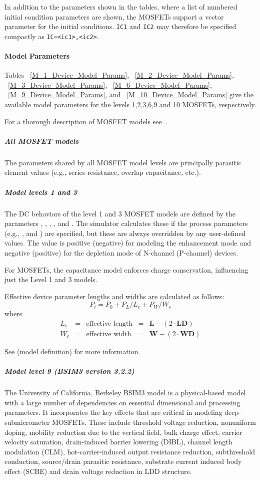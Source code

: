 In addition to the parameters shown in the tables, where a list of
numbered initial condition parameters are shown, the MOSFETs support a vector
parameter for the initial conditions.  \texttt{IC1} and \texttt{IC2}
may therefore be specified compactly as \texttt{IC=<ic1>,<ic2>}.

\paragraph{Model Parameters}
Tables ~\ref{M_1_Device_Model_Params}, ~\ref{M_2_Device_Model_Params},
~\ref{M_3_Device_Model_Params}, ~\ref{M_6_Device_Model_Params},
~\ref{M_9_Device_Model_Params}, and ~\ref{M_10_Device_Model_Params}
give the available model parameters for the levels 1,2,3,6,9 and 10 MOSFETs,
respectively.

For a thorough description of MOSFET models see~\cite{Antognetti:1988, HLJHCKH,
BLETK:1997, SH:1968, VL:1980,
SSKJ:1987, Pierret:1984, YEC:1983, BSIM3:V3:1, BN}.

\subparagraph{All MOSFET models}
The parameters shared by all MOSFET model levels are principally parasitic
element values (e.g., series resistance, overlap capacitance, etc.).

\subparagraph{Model levels 1 and 3}
The DC behaviors of the level 1 and 3 MOSFET models are defined by the
parameters , , , , and
.  The simulator calculates these if the process parameters
(e.g., , and ) are specified, but these are always
overridden by any user-defined values. The  value is positive
(negative) for modeling the enhancement mode and negative (positive) for the
depletion mode of N-channel (P-channel) devices.

For MOSFETs, the capacitance model enforces charge conservation,
influencing just the Level 1 and 3 models.

Effective device parameter lengths and widths are calculated as follows:
\[
P_i = P_0 + P_L / L_e + P_W / W_e
\]
where
\[
\begin{array}{rclcl}
L_e & = & \mbox{effective length} & = & \mathbf{L} - (2 \cdot \mathbf{LD}) \\
W_e & = & \mbox{effective width} & = & \mathbf{W} - (2 \cdot \mathbf{WD})
\end{array}
\]

See  (model definition) for more information.

\subparagraph{Model level 9 (BSIM3 version 3.2.2)}
The University of California, Berkeley BSIM3 model is a physical-based model
with a large number of dependencies on essential dimensional and processing
parameters.  It incorporates the key effects that are critical in modeling
deep-submicrometer MOSFETs.  These include threshold voltage reduction,
nonuniform doping, mobility reduction due to the vertical field, bulk charge
effect, carrier velocity saturation, drain-induced barrier lowering (DIBL),
channel length modulation (CLM), hot-carrier-induced output resistance
reduction, subthreshold conduction, source/drain parasitic resistance,
substrate current induced body effect (SCBE) and drain voltage reduction in LDD
structure.

